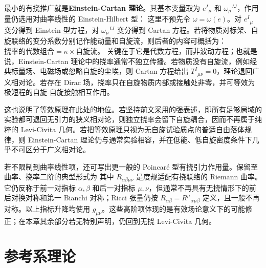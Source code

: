 最小的有挠推广就是\textbf{Einstein-Cartan 理论}。其基本变量取为 $e^I{}_\mu$ 和 $\omega_\mu{}^{IJ}$，作用量仍选用对曲率线性的 Einstein-Hilbert 型：
这里不预先令 $\omega=\omega(e)$。对 $e^I{}_\mu$ 变分得到 Einstein 型方程，对 $\omega_\mu{}^{IJ}$ 变分得到 Cartan 方程。若将物质对标架、自旋联络的变分系数分别记作能动量和自旋流，则后者的内容可概括为：$\textit{挠率的代数组合}=\kappa\times\textit{自旋流}$。
关键在于它是代数方程，而非波动方程；也就是说，Einstein-Cartan 理论中的挠率通常不独立传播。若物质没有自旋流，例如经典标量场、电磁场或忽略自旋的尘埃，则 Cartan 方程给出 $T^I{}_{\mu\nu}=0$，理论退回广义相对论。若存在 Dirac 场，挠率只在自旋物质内部或接触处非零，并可等效为极短程的自旋-自旋接触相互作用。

这也说明了等效原理在此处的地位。若坚持前文采用的强表述，即所有足够局域的实验都可退回无引力的狭义相对论，则独立挠率会留下自旋耦合，因而不再属于纯粹的 Levi-Civita 几何。若把等效原理只视为无自旋试验质点的普适自由落体规律，则 Einstein-Cartan 理论仍与通常实验相容，并在低能、低自旋密度条件下几乎不可区分于广义相对论。

若不限制到曲率线性项，还可写出更一般的 Poincaré 型有挠引力作用量。保留至曲率、挠率二阶的典型形式为
其中 $R_{\alpha\beta\mu\nu}$ 是度规适配有挠联络的 Riemann 曲率。它仍反称于前一对指标 $\alpha,\beta$ 和后一对指标 $\mu,\nu$，但通常不再具有无挠情形下的前后对换对称和第一 Bianchi 对称；Ricci 张量仍按 $R_{\alpha\beta}=R^\mu{}_{\alpha\mu\beta}$ 定义，且一般不再对称。以上指标升降均使用 $g_{\mu\nu}$。这些高阶项体现的是有效场论意义下的可能修正；在本章其余部分若无特别声明，仍回到无挠 Levi-Civita 几何。

\section{参考系理论}
